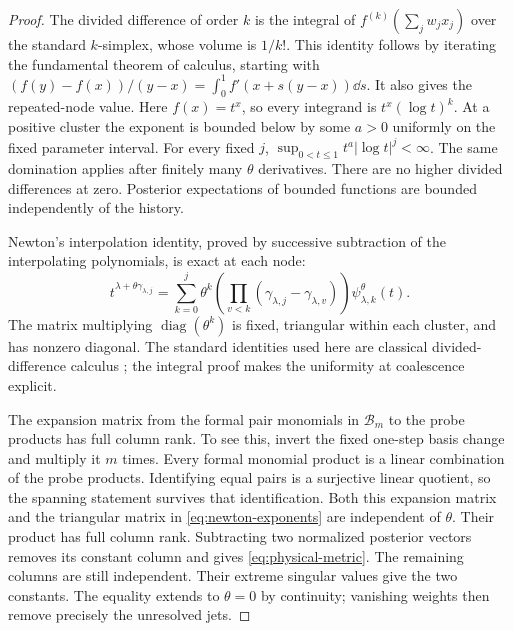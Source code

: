 \begin{proof}
The divided difference of order $k$ is the integral of
$f^{(k)}(\sum_jw_jx_j)$ over the standard $k$-simplex, whose volume is
$1/k!$. This identity follows by iterating the fundamental theorem of
calculus, starting with $(f(y)-f(x))/(y-x)=\int_0^1f'(x+s(y-x))\dd s$.
It also gives the repeated-node value. Here $f(x)=t^x$, so every
integrand is $t^x(\log t)^k$. At a positive cluster the exponent is
bounded below by some $a>0$ uniformly on the fixed parameter interval.
For every fixed $j$, $\sup_{0<t\le1}t^a|\log t|^j<\infty$.
The same domination applies after finitely many $\theta$ derivatives.
There are no higher divided differences at zero. Posterior expectations
of bounded functions are bounded independently of the history.

Newton's interpolation identity, proved by successive subtraction of
the interpolating polynomials, is exact at each node:
\begin{equation}\label{eq:newton-exponents}
 t^{\lambda+\theta\gamma_{\lambda,j}}
   =\sum_{k=0}^j\theta^k
      \left(\prod_{v<k}(\gamma_{\lambda,j}-\gamma_{\lambda,v})\right)
                  \psi_{\lambda,k}^\theta(t).
\end{equation}
The matrix multiplying $\operatorname{diag}(\theta^k)$ is fixed,
triangular within each cluster, and has nonzero diagonal. The standard
identities used here are classical divided-difference calculus
\cite{deBoor}; the integral proof makes the uniformity at coalescence
explicit.

The expansion matrix from the formal pair monomials in $\mathcal B_m$
to the probe products has full column rank. To see this, invert the fixed
one-step basis change and multiply it $m$ times. Every formal monomial
product is a linear combination of the probe products. Identifying equal
pairs is a surjective linear quotient, so the spanning statement survives
that identification. Both this expansion matrix and the triangular
matrix in \eqref{eq:newton-exponents} are independent of $\theta$.
Their product has full column rank. Subtracting two normalized posterior
vectors removes its constant column and gives \eqref{eq:physical-metric}.
The remaining columns are still independent. Their extreme singular
values give the two constants. The equality extends to $\theta=0$ by
continuity; vanishing weights then remove precisely the unresolved jets.
\end{proof}

